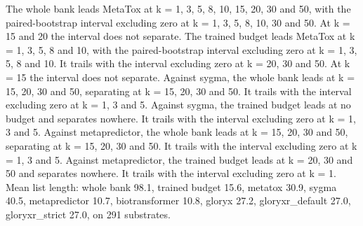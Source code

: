 The whole bank leads MetaTox at k = 1, 3, 5, 8, 10, 15, 20, 30 and 50, with the paired-bootstrap interval excluding zero at k = 1, 3, 5, 8, 10, 30 and 50. At k = 15 and 20 the interval does not separate.
The trained budget leads MetaTox at k = 1, 3, 5, 8 and 10, with the paired-bootstrap interval excluding zero at k = 1, 3, 5, 8 and 10. It trails with the interval excluding zero at k = 20, 30 and 50. At k = 15 the interval does not separate.
Against sygma, the whole bank leads at k = 15, 20, 30 and 50, separating at k = 15, 20, 30 and 50. It trails with the interval excluding zero at k = 1, 3 and 5.
Against sygma, the trained budget leads at no budget and separates nowhere. It trails with the interval excluding zero at k = 1, 3 and 5.
Against metapredictor, the whole bank leads at k = 15, 20, 30 and 50, separating at k = 15, 20, 30 and 50. It trails with the interval excluding zero at k = 1, 3 and 5.
Against metapredictor, the trained budget leads at k = 20, 30 and 50 and separates nowhere. It trails with the interval excluding zero at k = 1.
Mean list length: whole bank 98.1, trained budget 15.6, metatox 30.9, sygma 40.5, metapredictor 10.7, biotransformer 10.8, gloryx 27.2, gloryxr_default 27.0, gloryxr_strict 27.0, on 291 substrates.
